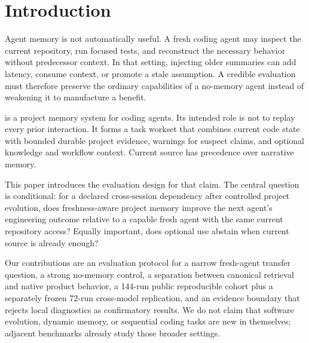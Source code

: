 \section{Introduction}

Agent memory is not automatically useful. A fresh coding agent may inspect the
current repository, run focused tests, and reconstruct the necessary behavior
without predecessor context. In that setting, injecting older summaries can add
latency, consume context, or promote a stale assumption. A credible evaluation
must therefore preserve the ordinary capabilities of a no-memory agent instead
of weakening it to manufacture a benefit.

\memorix{} is a project memory system for coding agents. Its intended role is
not to replay every prior interaction. It forms a task workset that combines
current code state with bounded durable project evidence, warnings for suspect
claims, and optional knowledge and workflow context. Current source has
precedence over narrative memory.

This paper introduces the evaluation design for that claim. The central question
is conditional: for a declared cross-session dependency after controlled project
evolution, does freshness-aware project memory improve the next agent's
engineering outcome relative to a capable fresh agent with the same current
repository access? Equally important, does optional use abstain when current
source is already enough?

Our contributions are an evaluation protocol for a narrow fresh-agent transfer
question, a strong no-memory control, a separation between canonical retrieval
and native product behavior, a 144-run public reproducible cohort plus a
separately frozen 72-run cross-model replication, and an evidence boundary
that rejects local diagnostics as confirmatory results. We do not claim that
software evolution, dynamic memory, or sequential coding tasks are new in
themselves; adjacent benchmarks already study those broader settings.
